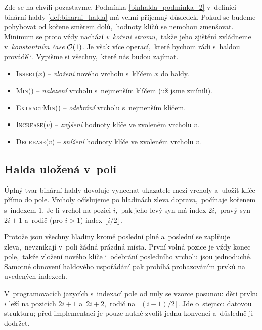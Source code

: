 Zde se na chvíli pozastavme. Podmínka \ref{binhalda_podminka_2} v~definici binární haldy \ref{def:binarni_halda} má velmi příjemný důsledek. Pokud se budeme pohybovat od kořene směrem dolů,~hodnoty klíčů se nemohou zmenšovat. Minimum se proto vždy nachází \emph{v~kořeni stromu},~takže jeho zjištění zvládneme v~\emph{konstantním čase} $\mathcal{O}(1)$.
Je však více operací,~které bychom rádi s~haldou prováděli. Vypišme si všechny,~které nás budou zajímat.
\begin{itemize}
    \item \textsc{Insert}($x$) -- \emph{vložení} nového vrcholu s~klíčem $x$ do haldy.
    \item \textsc{Min}() -- \emph{nalezení} vrcholu s~nejmenším klíčem (už jsme zmínili).
    \item \textsc{ExtractMin}() -- \emph{odebrání} vrcholu s~nejmenším klíčem.
    \item \textsc{Increase}($v$) -- \emph{zvýšení} hodnoty klíče ve zvoleném vrcholu $v$.
    \item \textsc{Decrease}($v$) -- \emph{snížení} hodnoty klíče ve zvoleném vrcholu $v$.
\end{itemize}

\subsection{Halda uložená v~poli}

Úplný tvar binární haldy dovoluje vynechat ukazatele mezi vrcholy a~uložit klíče přímo do pole. Vrcholy očíslujeme po hladinách zleva doprava,~počínaje kořenem s~indexem $1$. Je-li vrchol na pozici $i$,~pak jeho levý syn má index $2i$,~pravý syn $2i+1$ a~rodič (pro $i>1$) index $\lfloor i/2\rfloor$.

Protože jsou všechny hladiny kromě poslední plné a~poslední se zaplňuje zleva,~nevznikají v~poli žádná prázdná místa. První volná pozice je vždy konec pole,~takže vložení nového klíče i~odebrání posledního vrcholu jsou jednoduché. Samotné obnovení haldového uspořádání pak probíhá prohazováním prvků na uvedených indexech.

V~programovacích jazycích s~indexací pole od nuly se vzorce posunou: děti prvku $i$ leží na pozicích $2i+1$ a~$2i+2$,~rodič na $\lfloor(i-1)/2\rfloor$. Jde o~stejnou datovou strukturu; před implementací je pouze nutné zvolit jednu konvenci a~důsledně ji dodržet.

